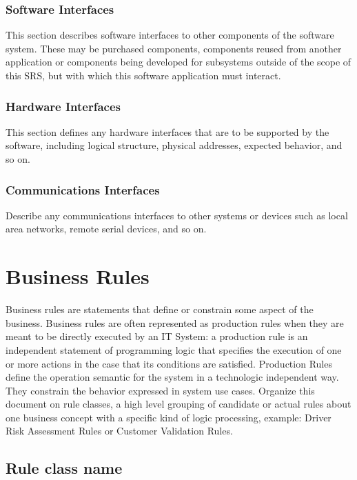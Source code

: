 \subsubsection{Software Interfaces}

This section describes software interfaces to other components of the software system. These may be purchased components, components reused from another application or components being developed for subsystems outside of the scope of this SRS, but with which this software application must interact.

\subsubsection{Hardware Interfaces}

This section defines any hardware interfaces that are to be supported by the software, including logical structure, physical addresses, expected behavior, and so on.

\subsubsection{Communications Interfaces}

Describe any communications interfaces to other systems or devices such as local area networks, remote serial devices, and so on.

\section{Business Rules}

Business rules are statements that define or constrain some aspect of the business. Business rules are often represented as production rules when they are meant to be directly executed by an IT System: a production rule is an independent statement of programming logic that specifies the execution of one or more actions in the case that its conditions are satisfied. Production Rules define the operation semantic for the system in a technologic independent way. They constrain the behavior expressed in system use cases.
Organize this document on rule classes, a high level grouping of candidate or actual rules about one business concept with a specific kind of logic processing, example: Driver Risk Assessment Rules or Customer Validation Rules.


\subsection{Rule class name}

